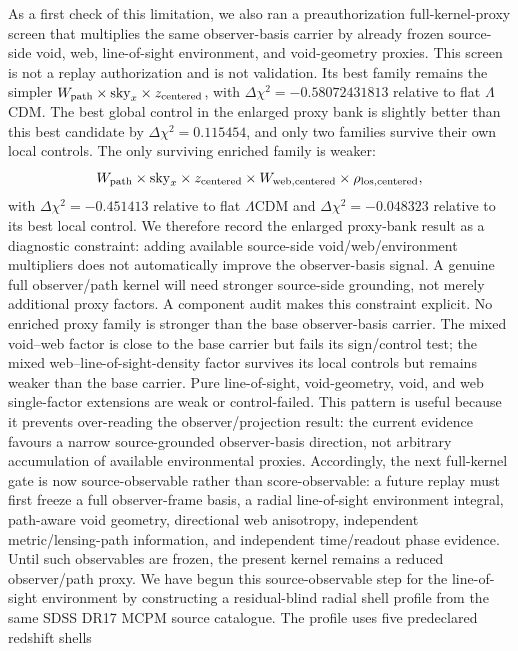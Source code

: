 \documentclass[11pt]{article}
\begin{document}
As a first check of this limitation, we also ran a preauthorization
full-kernel-proxy screen that multiplies the same observer-basis carrier by
already frozen source-side void, web, line-of-sight environment, and
void-geometry proxies.  This screen is not a replay authorization and is not
validation.  Its best family remains the simpler
\(W_{\rm path}\times\mathrm{sky}_x\times z_{\rm centered}\), with
\(\Delta\chi^2=-0.58072431813\) relative to flat \(\Lambda\)CDM.  The best
global control in the enlarged proxy bank is slightly better than this best
candidate by \(\Delta\chi^2=0.115454\), and only two families survive their
own local controls.  The only surviving enriched family is weaker:
\[
W_{\rm path}\times\mathrm{sky}_x\times z_{\rm centered}
\times W_{\rm web,centered}\times \rho_{\rm los,centered},
\]
with \(\Delta\chi^2=-0.451413\) relative to flat \(\Lambda\)CDM and
\(\Delta\chi^2=-0.048323\) relative to its best local control.  We therefore
record the enlarged proxy-bank result as a diagnostic constraint: adding
available source-side void/web/environment multipliers does not automatically
improve the observer-basis signal.  A genuine full observer/path kernel will
need stronger source-side grounding, not merely additional proxy factors.
A component audit makes this constraint explicit.  No enriched proxy family is
stronger than the base observer-basis carrier.  The mixed void--web factor is
close to the base carrier but fails its sign/control test; the mixed
web--line-of-sight-density factor survives its local controls but remains
weaker than the base carrier.  Pure line-of-sight, void-geometry, void, and web
single-factor extensions are weak or control-failed.  This pattern is useful
because it prevents over-reading the observer/projection result: the current
evidence favours a narrow source-grounded observer-basis direction, not
arbitrary accumulation of available environmental proxies.
Accordingly, the next full-kernel gate is now source-observable rather than
score-observable: a future replay must first freeze a full observer-frame basis,
a radial line-of-sight environment integral, path-aware void geometry,
directional web anisotropy, independent metric/lensing-path information, and
independent time/readout phase evidence.  Until such observables are frozen, the
present kernel remains a reduced observer/path proxy.
We have begun this source-observable step for the line-of-sight environment by
constructing a residual-blind radial shell profile from the same SDSS DR17 MCPM
source catalogue.  The profile uses five predeclared redshift shells
\end{document}
